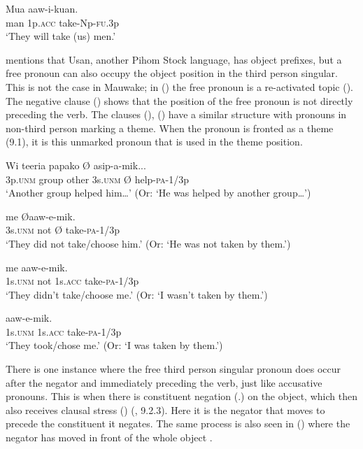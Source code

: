 \ea%
\label{ex:x557}
\gll Mua  aaw-i-kuan. \\
man 1p.\textsc{acc} take-Np-\textsc{fu}.3p\\
\glt`They will take (us) men.'
\z

\citet[52--53]{Reesink1987} mentions that Usan, another Pihom Stock language, has object prefixes, but a free pronoun can also occupy the object position in the third person singular. This is not the case in Mauwake; in () the free pronoun  is a re-activated topic (). The negative clause () shows that the position of the free pronoun is not directly preceding the verb. The clauses (), () have a similar structure with pronouns in non-third person marking a theme. When the pronoun is fronted as a theme (9.1), it is this unmarked pronoun that is used in the theme position. 

\ea%
\label{ex:x1354}
\gll Wi teeria papako  {\O} asip-a-mik... \\
3p.\textsc{unm} group other 3s.\textsc{unm} {\O} help-\textsc{pa}-1/3p\\
\glt`Another group helped him{\dots}' (Or: `He was helped by another group{\dots}')
\z

\ea%
\label{ex:x1353}
\gll {} me {\O aaw-e-mik.} \\
3s.\textsc{unm} not {\O} take-\textsc{pa}-1/3p\\
\glt`They did not take/choose him.' (Or: `He was not taken by them.')
\z

\ea%
\label{ex:x684}
\gll {} me  aaw-e-mik. \\
1s.\textsc{unm} not 1s.\textsc{acc} take-\textsc{pa}-1/3p\\
\glt`They didn't take/choose me.' (Or: `I wasn't taken by them.')
\z

\ea%
\label{ex:x560}
\gll {}  aaw-e-mik. \\
1s.\textsc{unm} 1s.\textsc{acc} take-\textsc{pa}-1/3p\\
\glt`They took/chose me.' (Or: `I was taken by them.')
\z

There is one instance where the free third person singular pronoun does occur after the negator and immediately preceding the verb, just like accusative pronouns. This is when there is constituent negation (.) on the object, which then also receives clausal stress () (, 9.2.3). Here it is the negator that moves to precede the constituent it negates. The same process is also seen in () where the negator has moved in front of the whole object . 

